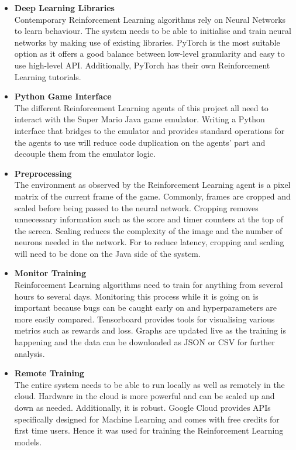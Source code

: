 \documentclass[notitlepage,a4paper,11pt]{article}
\begin{document}
\begin{itemize}
	\item \textbf{Deep Learning Libraries}\\
	Contemporary Reinforcement Learning algorithms rely on Neural Networks to learn behaviour. The system needs to be able to initialise and train neural networks by making use of existing libraries. PyTorch is the most suitable option as it offers a good balance between low-level granularity and easy to use high-level API. Additionally, PyTorch has their own Reinforcement Learning tutorials.
	
	\item \textbf{Python Game Interface}\\
	The different Reinforcement Learning agents of this project all need to interact with the Super Mario Java game emulator. Writing a Python interface that bridges to the emulator and provides standard operations for the agents to use will reduce code duplication on the agents' part and decouple them from the emulator logic.
	
	\item \textbf{Preprocessing}\\
	The environment as observed by the Reinforcement Learning agent is a pixel matrix of the current frame of the game. Commonly, frames are cropped and scaled before being passed to the neural network. Cropping removes unnecessary information such as the score and timer counters at the top of the screen. Scaling reduces the complexity of the image and the number of neurons needed in the network. For to reduce latency, cropping and scaling will need to be done on the Java side of the system.
	
	\item \textbf{Monitor Training}\\
	Reinforcement Learning algorithms need to train for anything from several hours to several days. Monitoring this process while it is going on is important because bugs can be caught early on and hyperparameters are more easily compared. Tensorboard provides tools for visualising various metrics such as rewards and loss. Graphs are updated live as the training is happening and the data can be downloaded as JSON or CSV for further analysis.
	
	\item \textbf{Remote Training}\\
	The entire system needs to be able to run locally as well as remotely in the cloud. Hardware in the cloud is more powerful and can be scaled up and down as needed. Additionally, it is robust. Google Cloud provides APIs specifically designed for Machine Learning and comes with free credits for first time users. Hence it was used for training the Reinforcement Learning models.
	
\end{itemize}
\end{document}
